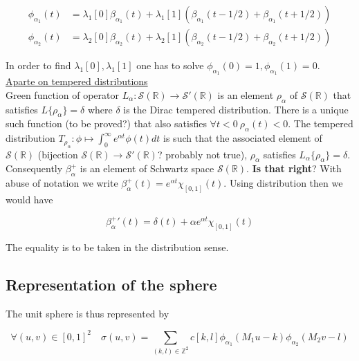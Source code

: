 \documentclass[a4paper, 11pt]{article}
\begin{document}
\begin{align*}
  \phi_{\alpha_1}(t) &= \lambda_1[0]\beta_{\alpha_1}(t) + \lambda_1[1](\beta_{\alpha_1}(t-1/2) + 
  \beta_{\alpha_1}(t+1/2)) \\
  \phi_{\alpha_2}(t) &= \lambda_2[0]\beta_{\alpha_2}(t) + \lambda_2[1](\beta_{\alpha_2}(t-1/2) + 
  \beta_{\alpha_2}(t+1/2)) 
\end{align*}

In order to find $\lambda_1[0], \lambda_1[1]$ one has to solve $\phi_{\alpha_1}(0) = 1, \phi_{\alpha_1}(1) = 0$. \\ 

\underline{Aparte on tempered distributions} \\

Green function of operator $L_{\alpha}: \mathcal{S}(\mathbb{R}) \to \mathcal{S}'(\mathbb{R})$ is an element 
$\rho_{\alpha}$ of $\mathcal{S}(\mathbb{R})$ that satisfies $L\{\rho_{\alpha}\} = \delta$ where $\delta$ is the Dirac 
tempered distribution. There is a unique such function (to be proved?) that also satisfies $\forall t < 0 \ 
\rho_{\alpha}(t) < 0$. The tempered distribution $T_{\rho_{\alpha}} : \phi \mapsto \int_{0}^{\infty} e^{\alpha t} 
\phi(t) dt$ is such that the associated element of $\mathcal{S}(\mathbb{R})$ (bijection $\mathcal{S}(\mathbb{R}) \to 
\mathcal{S}'(\mathbb{R})$? probably not true), $\rho_{\alpha}$ satisfies $L_{\alpha}\{\rho_{\alpha}\} = \delta$. \\

Consequently $\beta^+_{\alpha}$ is an element of Schwartz space $\mathcal{S}(\mathbb{R})$. \textbf{Is that right}? With 
abuse of notation we write $\beta^+_{\alpha}(t) = e^{\alpha t}\chi_{[0,1]}(t)$. Using distribution then we would have

\begin{equation*}
  {\beta^+_{\alpha}}'(t) = \delta(t) + \alpha e^{\alpha t}\chi_{[0,1]}(t)
\end{equation*}

The equality is to be taken in the distribution sense. 

\subsection{Representation of the sphere}

The unit sphere is thus represented by

\begin{equation}
  \forall (u,v) \in {[0,1]}^2 \quad \sigma(u,v) = \sum_{(k,l) \in \mathbb{Z}^2} c[k,l] \phi_{\alpha_1}(M_1u-k) 
  \phi_{\alpha_2}(M_2v-l)
\end{equation}
\end{document}
